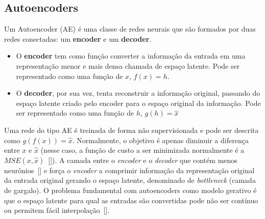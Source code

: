 \subsection{Autoencoders}
\label{ae_coding}
Um Autoencoder (\acrshort{AE}) é uma classe de redes neurais que são formados por duas redes conectadas: um \textbf{encoder} e um \textbf{decoder}.
\begin{itemize}
\item O \textbf{encoder} tem como função converter a informação da entrada em uma representação menor e mais densa chamada de espaço latente. Pode ser representado como uma função de $x$, $f(x) = h$.
\item O \textbf{decoder}, por sua vez, tenta reconstruir a informação original, passando do espaço latente criado pelo encoder para o espaço original da informação. Pode ser representado como uma função de $h$, $g(h) = \hat{x}$
\end{itemize} 
Uma rede do tipo \acrshort{AE} é treinada de forma não supervisionada e pode ser descrita como $g(f(x)) = \hat{x}$. Normalmente, o objetivo é apenas diminuir a diferença entre $x$ e $\hat{x}$ (nesse caso, a função de custo a ser minimizada normalmente é a $MSE(x, \hat{x})$~[]). A camada entre o \textit{encoder} e o \textit{decoder} que contém menos neurônios~[] e força o \textit{encoder} a comprimir informação da representação original da entrada original gerando o espaço latente, denominado de \textit{bottleneck} (camada de gargalo). 
O problema fundamental com autoencoders como modelo gerativo é que o espaço latente para qual as entradas são convertidas pode não ser contínuo ou permitem fácil interpolação~[].

